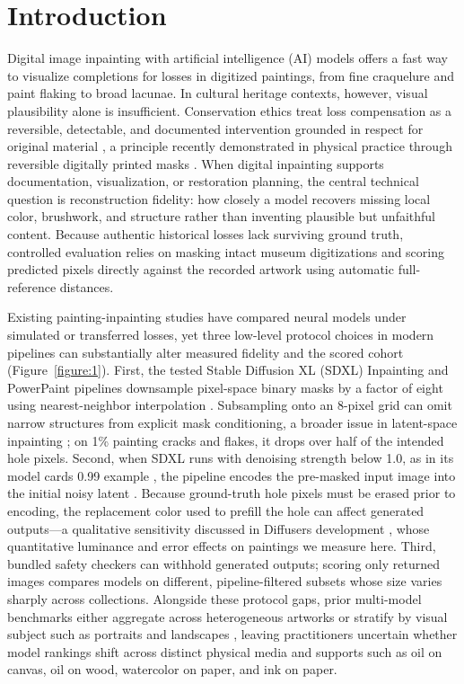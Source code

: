 \documentclass[applsci,article,submit,pdftex,moreauthors]{Definitions/mdpi}
\begin{document}
\section{Introduction}\label{introduction}

Digital image inpainting with artificial intelligence (AI) models offers a fast way to visualize completions for losses in digitized paintings, from fine craquelure and paint flaking to broad lacunae. In cultural heritage contexts, however, visual plausibility alone is insufficient. Conservation ethics treat loss compensation as a reversible, detectable, and documented intervention grounded in respect for original material \citep{icomcc2008, aic1994}, a principle recently demonstrated in physical practice through reversible digitally printed masks \citep{kachkine2025}. When digital inpainting supports documentation, visualization, or restoration planning, the central technical question is reconstruction fidelity: how closely a model recovers missing local color, brushwork, and structure rather than inventing plausible but unfaithful content. Because authentic historical losses lack surviving ground truth, controlled evaluation relies on masking intact museum digitizations and scoring predicted pixels directly against the recorded artwork using automatic full-reference distances.

Existing painting-inpainting studies have compared neural models under simulated or transferred losses, yet three low-level protocol choices in modern pipelines can substantially alter measured fidelity and the scored cohort (Figure~\ref{figure:1}). First, the tested Stable Diffusion XL (SDXL) Inpainting and PowerPaint pipelines downsample pixel-space binary masks by a factor of eight using nearest-neighbor interpolation \citep{diffuserssdxl0352, powerpaintv1src}. Subsampling onto an 8-pixel grid can omit narrow structures from explicit mask conditioning, a broader issue in latent-space inpainting \citep{shamsolmoali2025tdpaint}; on 1\% painting cracks and flakes, it drops over half of the intended hole pixels. Second, when SDXL runs with denoising strength below 1.0, as in its model card\textquotesingle s 0.99 example \citep{sdxlinpaint}, the pipeline encodes the pre-masked input image into the initial noisy latent \citep{diffuserssdxl0352}. Because ground-truth hole pixels must be erased prior to encoding, the replacement color used to prefill the hole can affect generated outputs---a qualitative sensitivity discussed in Diffusers development \citep{diffusers8450}, whose quantitative luminance and error effects on paintings we measure here. Third, bundled safety checkers can withhold generated outputs; scoring only returned images compares models on different, pipeline-filtered subsets whose size varies sharply across collections. Alongside these protocol gaps, prior multi-model benchmarks either aggregate across heterogeneous artworks \citep{hu2025imagest} or stratify by visual subject such as portraits and landscapes \citep{controlled300}, leaving practitioners uncertain whether model rankings shift across distinct physical media and supports such as oil on canvas, oil on wood, watercolor on paper, and ink on paper.
\end{document}
